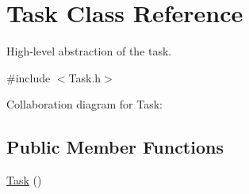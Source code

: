 \hypertarget{classTask}{}\section{Task Class Reference}
\label{classTask}


High-\/level abstraction of the task.  




{\ttfamily \#include $<$Task.\+h$>$}



Collaboration diagram for Task\+:
\subsection*{Public Member Functions}
\begin{DoxyCompactItemize}
\item 
\hyperlink{classTask_a0ca53354bdc006762a0fda68c64f7608}{Task} ()\hypertarget{classTask_a0ca53354bdc006762a0fda68c64f7608}{}\label{classTask_a0ca53354bdc006762a0fda68c64f7608}


\end{DoxyCompactItemize}
